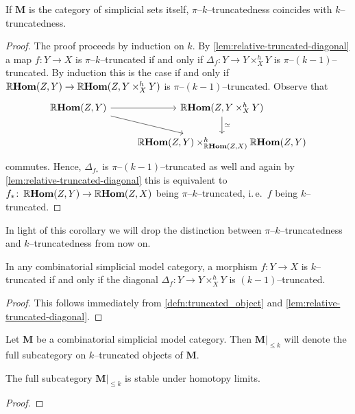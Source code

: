 \begin{corollary}\label{cor:truncatedness-makes-sense}
  If \(\mathbf{M}\) is the category of simplicial sets itself, \(\pi\)--\(k\)--truncatedness coincides with \(k\)--truncatedness.
\end{corollary}
\begin{proof}
  The proof proceeds by induction on \(k\). By \autoref{lem:relative-truncated-diagonal} a map \(f\colon Y\to X\) is \(\pi\)--\(k\)--truncated if and only if \(\Delta_{f}\colon Y\to Y\times_{X}^{h} Y\) is \(\pi\)--\((k-1)\)--truncated. By induction this is the case if and only if \(\operatorname{\mathbb{R}\textnormal{\bfseries Hom}}(Z,Y)\to \operatorname{\mathbb{R}\textnormal{\bfseries Hom}}(Z, Y\times_{X}^{h} Y)\) is \(\pi\)--\((k-1)\)--truncated. Observe that
  \[
  \begin{tikzcd}
    \RHom(Z,Y) \arrow[r] \arrow[dr] & \RHom(Z, Y\times^{h}_{X} Y) \arrow[d, "\simeq"] \\
    {} & \RHom(Z, Y)\times_{\RHom(Z, X)}^{h} \RHom(Z,Y)
  \end{tikzcd}
  \]
  commutes. Hence, \(\Delta_{f_{*}}\) is \(\pi\)--\((k-1)\)--truncated as well and again by \autoref{lem:relative-truncated-diagonal} this is equivalent to \(f_{*}\colon \operatorname{\mathbb{R}\textnormal{\bfseries Hom}}(Z, Y)\to\operatorname{\mathbb{R}\textnormal{\bfseries Hom}}(Z, X)\) being \(\pi\)--\(k\)--truncated, i.\,e.~\(f\) being \(k\)--truncated.
\end{proof}

In light of this corollary we will drop the distinction between \(\pi\)--\(k\)--truncatedness and \(k\)--truncated\-ness from now on.

\begin{corollary}\label{cor:general-diagonal-truncated}
  In any combinatorial simplicial model category, a morphism \(f\colon Y\to X\) is \(k\)--truncated if and only if the diagonal \(\Delta_{f}\colon Y\to Y\times^{h}_{X} Y\) is \((k-1)\)--truncated.
\end{corollary}
\begin{proof}
  This follows immediately from \autoref{defn:truncated_object} and \autoref{lem:relative-truncated-diagonal}.
\end{proof}

\begin{definition}
  Let \(\mathbf{M}\) be a combinatorial simplicial model category. Then \(\mathbf{M}|_{{\leq}k}\) will denote the full subcategory on \(k\)--truncated objects of \(\mathbf{M}\).
\end{definition}

\begin{proposition}\label{prop:truncated-objects-limits}
  The full subcategory \(\mathbf{M}|_{{\leq} k}\) is stable under homotopy limits.
\end{proposition}
\begin{proof}
\end{proof}

